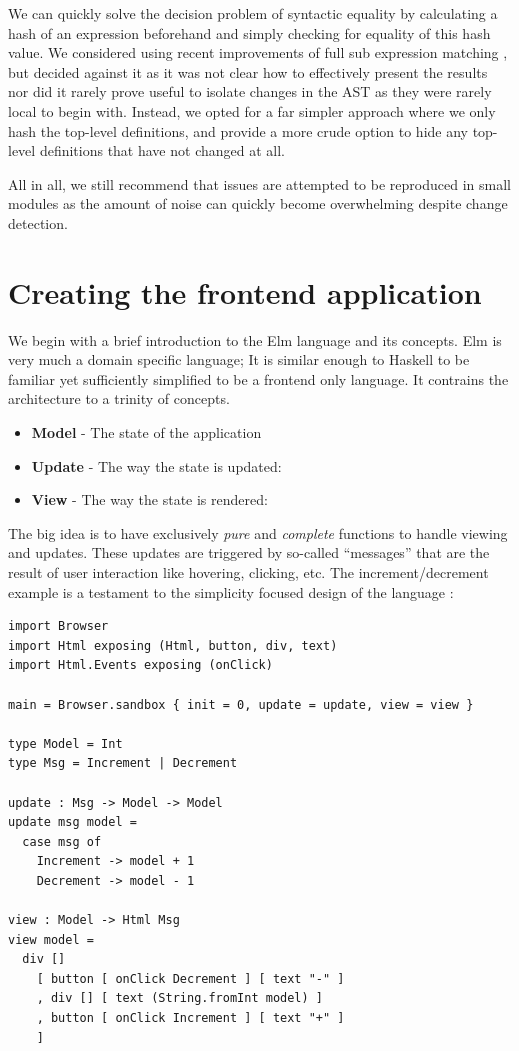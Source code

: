 We can quickly solve the decision problem of syntactic equality by calculating a hash of an expression beforehand
and simply checking for equality of this hash value. We considered using recent improvements of full sub expression
matching \cite{hashing_mod_alpha}, but decided against it as it was not clear how to effectively present the results
nor did it rarely prove useful to isolate changes in the AST as they were rarely local to begin with.
Instead, we opted for a far simpler approach where we only hash the top-level definitions, and provide a more crude
option to hide any top-level definitions that have not changed at all.

All in all, we still recommend that issues are attempted to be reproduced in small modules as the amount of
noise can quickly become overwhelming despite change detection.

\section{Creating the frontend application}

We begin with a brief introduction to the Elm language and its concepts. Elm is very much a domain specific language; It is 
similar enough to Haskell to be familiar yet sufficiently simplified to be a frontend only language. It contrains the architecture
to a trinity of concepts.

\begin{itemize}
  \item \textbf{Model} - The state of the application
  \item \textbf{Update} - The way the state is updated: 
  \item \textbf{View} - The way the state is rendered: 
\end{itemize}

The big idea is to have exclusively \textit{pure} and \textit{complete} functions to handle viewing and updates.
These updates are triggered by so-called ``messages'' that are the result of user interaction like hovering, clicking, etc.
The increment/decrement example is a testament to the simplicity focused design of the language \cite{elm_lang}:

\begin{listing}[H]
\begin{verbatim}
import Browser
import Html exposing (Html, button, div, text)
import Html.Events exposing (onClick)

main = Browser.sandbox { init = 0, update = update, view = view }

type Model = Int
type Msg = Increment | Decrement

update : Msg -> Model -> Model
update msg model =
  case msg of
    Increment -> model + 1
    Decrement -> model - 1

view : Model -> Html Msg
view model =
  div []
    [ button [ onClick Decrement ] [ text "-" ]
    , div [] [ text (String.fromInt model) ]
    , button [ onClick Increment ] [ text "+" ]
    ]
\end{verbatim}
\end{listing}


